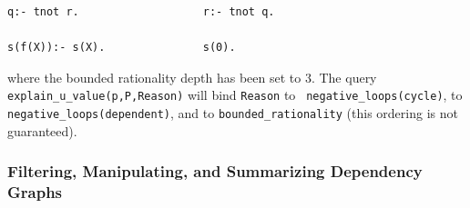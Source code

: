 \begin{description}
\begin{example}
\begin{verbatim}
q:- tnot r.                   r:- tnot q.

s(f(X)):- s(X).               s(0).
\end{verbatim}
%
where the bounded rationality depth has been set to 3.  The query {\tt
  explain\_u\_value(p,P,Reason)} will bind {\tt Reason} to {\tt
  negative\_loops(cycle)}, to {\tt negative\_loops(dependent)}, and
to {\tt bounded\_rationality} (this ordering is not guaranteed).
\end{example}
\end{description}

\subsubsection{Filtering, Manipulating, and Summarizing Dependency Graphs} \label{sec:dependency-graph-manipulation}

